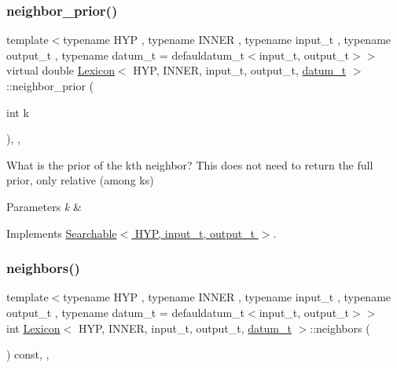 \subsubsection{\texorpdfstring{neighbor\+\_\+prior()}{neighbor\_prior()}}
{\footnotesize\ttfamily template$<$typename H\+YP , typename I\+N\+N\+ER , typename input\+\_\+t , typename output\+\_\+t , typename datum\+\_\+t  = defauldatum\+\_\+t$<$input\+\_\+t, output\+\_\+t$>$$>$ \\
virtual double \hyperlink{class_lexicon}{Lexicon}$<$ H\+YP, I\+N\+N\+ER, input\+\_\+t, output\+\_\+t, \hyperlink{class_bayesable_a9f1a6c0cd7855550fa10b1a8f13a5867}{datum\+\_\+t} $>$\+::neighbor\+\_\+prior (\begin{DoxyParamCaption}\item[{int}]{k }\end{DoxyParamCaption})\hspace{0.3cm}{\ttfamily [inline]}, {\ttfamily [override]}, {\ttfamily [virtual]}}



What is the prior of the k\textquotesingle{}th neighbor? This does not need to return the full prior, only relative (among ks) 


\begin{DoxyParams}{Parameters}
{\em k} & \\
\hline
\end{DoxyParams}


Implements \hyperlink{class_searchable_abebbaaf94b0502a35d0ba686af73bd08}{Searchable$<$ H\+Y\+P, input\+\_\+t, output\+\_\+t $>$}.

\mbox{\label{class_lexicon_a6419f323377d4c524363707eee0cae09}} 
\subsubsection{\texorpdfstring{neighbors()}{neighbors()}}
{\footnotesize\ttfamily template$<$typename H\+YP , typename I\+N\+N\+ER , typename input\+\_\+t , typename output\+\_\+t , typename datum\+\_\+t  = defauldatum\+\_\+t$<$input\+\_\+t, output\+\_\+t$>$$>$ \\
int \hyperlink{class_lexicon}{Lexicon}$<$ H\+YP, I\+N\+N\+ER, input\+\_\+t, output\+\_\+t, \hyperlink{class_bayesable_a9f1a6c0cd7855550fa10b1a8f13a5867}{datum\+\_\+t} $>$\+::neighbors (\begin{DoxyParamCaption}{ }\end{DoxyParamCaption}) const\hspace{0.3cm}{\ttfamily [inline]}, {\ttfamily [override]}, {\ttfamily [virtual]}}



